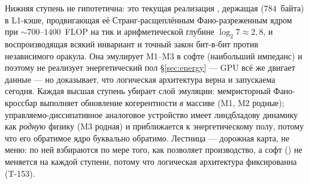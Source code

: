 Нижняя ступень не гипотетична: это текущая реализация \SYNARC{}, держащая
\DM{} ($784$~байта) в L1-кэше, продвигающая её Странг-расщеплённым
Фано-разреженным ядром при $\sim\!700$--$1400$~FLOP на тик и арифметической
глубине $\log_2 7\approx 2{,}8$, и воспроизводящая всякий инвариант и точный
закон бит-в-бит против независимого оракула. Она эмулирует M1--M3 в софте
(наибольший импеданс) и поэтому не реализует энергетический пол \S\ref{sec:energy}
--- GPU всё же двигает данные --- но доказывает, что логическая архитектура верна
и запускаема сегодня. Каждая высшая ступень убирает слой эмуляции: мемристорный
Фано-кроссбар выполняет обновление когерентности \emph{в} массиве (M1, M2 родные);
управляемо-диссипативное аналоговое устройство имеет линдбладову динамику как
\emph{родную} физику (M3 родная) и приближается к энергетическому полу, потому
что его обратимое ядро буквально обратимо. Лестница --- дорожная карта, не меню:
по ней взбираются по мере того, как позволяет производство, а софт (\SYNARC{}) не
меняется на каждой ступени, потому что логическая архитектура фиксированна (T-153).
